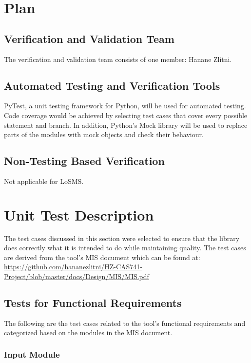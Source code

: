 \documentclass[12pt, titlepage]{article}
\newcommand{\famname}{LoSMS}
\begin{document}
\section{Plan} \label{Plan}
	
\subsection{Verification and Validation Team}

The verification and validation team consists of one member: Hanane Zlitni.

\subsection{Automated Testing and Verification Tools}

PyTest, a unit testing framework for Python, will be used for automated 
testing. Code coverage would be achieved by selecting test cases that cover 
every possible statement and branch. In addition, Python's Mock library will be 
used to replace parts of the modules with mock objects and check their 
behaviour.

\subsection{Non-Testing Based Verification}

Not applicable for \famname{}.

\section{Unit Test Description} \label{UnitTestDescription}

The test cases discussed in this section were selected to ensure that the 
library does correctly what it is intended to do while maintaining quality. The 
test cases are derived from the tool's MIS document which can be found at: 
\url{https://github.com/hananezlitni/HZ-CAS741-Project/blob/master/docs/Design/MIS/MIS.pdf}

\subsection{Tests for Functional Requirements}

The following are the test cases related to the tool's functional requirements 
and categorized based on the modules in the MIS document.

\subsubsection{Input Module}
\end{document}
